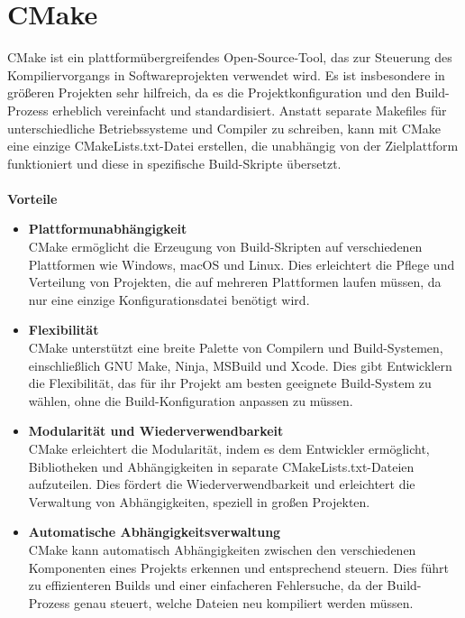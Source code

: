 \section{CMake}
\label{sec:tooling-cmake}
CMake ist ein plattformübergreifendes Open-Source-Tool, das zur Steuerung des Kompiliervorgangs in Softwareprojekten verwendet wird.
Es ist insbesondere in größeren Projekten sehr hilfreich, da es die Projektkonfiguration und den Build-Prozess erheblich vereinfacht und standardisiert.
Anstatt separate Makefiles für unterschiedliche Betriebssysteme und Compiler zu schreiben, kann mit CMake eine einzige CMakeLists.txt-Datei erstellen, die unabhängig von der Zielplattform funktioniert und diese in spezifische Build-Skripte übersetzt. \cite{Cmake2024}\\\\
\textbf{Vorteile}
\begin{itemize}
    \item \textbf{Plattformunabhängigkeit}\\
    CMake ermöglicht die Erzeugung von Build-Skripten auf verschiedenen Plattformen wie Windows, macOS und Linux.
    Dies erleichtert die Pflege und Verteilung von Projekten, die auf mehreren Plattformen laufen müssen, da nur eine einzige Konfigurationsdatei benötigt wird.
    \item \textbf{Flexibilität}\\
    CMake unterstützt eine breite Palette von Compilern und Build-Systemen, einschließlich GNU Make, Ninja, MSBuild und Xcode.
    Dies gibt Entwicklern die Flexibilität, das für ihr Projekt am besten geeignete Build-System zu wählen, ohne die Build-Konfiguration anpassen zu müssen.
    \item \textbf{Modularität und Wiederverwendbarkeit}\\
    CMake erleichtert die Modularität, indem es dem Entwickler ermöglicht, Bibliotheken und Abhängigkeiten in separate CMakeLists.txt-Dateien aufzuteilen.
    Dies fördert die Wiederverwendbarkeit und erleichtert die Verwaltung von Abhängigkeiten, speziell in großen Projekten.
    \item \textbf{Automatische Abhängigkeitsverwaltung}\\
    CMake kann automatisch Abhängigkeiten zwischen den verschiedenen Komponenten eines Projekts erkennen und entsprechend steuern.
    Dies führt zu effizienteren Builds und einer einfacheren Fehlersuche, da der Build-Prozess genau steuert, welche Dateien neu kompiliert werden müssen.
\end{itemize}
